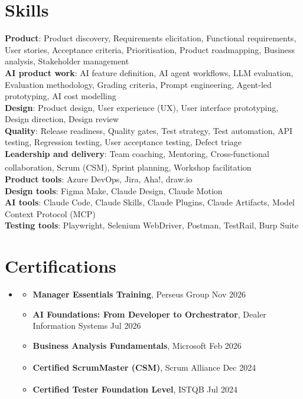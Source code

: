 \documentclass[letterpaper,11pt]{article}
\newcommand{\resumeItem}[1]{\item\small{#1 \vspace{-3.5pt}}}
\newcommand{\resumeSubHeadingListStart}{\begin{itemize}[leftmargin=0.15in, label={}]}
\newcommand{\resumeSubHeadingListEnd}{\end{itemize}}
\newcommand{\resumeItemListStart}{\begin{itemize}[topsep=3pt]}
\newcommand{\resumeItemListEnd}{\end{itemize}\vspace{-4pt}}
\begin{document}
\section{Skills}
 \begin{itemize}[leftmargin=0.15in, label={}]
    \small{\item{
     \textbf{Product}{: Product discovery, Requirements elicitation, Functional requirements, User stories, Acceptance criteria, Prioritisation, Product roadmapping, Business analysis, Stakeholder management} \\
     \textbf{AI product work}{: AI feature definition, AI agent workflows, LLM evaluation, Evaluation methodology, Grading criteria, Prompt engineering, Agent-led prototyping, AI cost modelling} \\
     \textbf{Design}{: Product design, User experience (UX), User interface prototyping, Design direction, Design review} \\
     \textbf{Quality}{: Release readiness, Quality gates, Test strategy, Test automation, API testing, Regression testing, User acceptance testing, Defect triage} \\
     \textbf{Leadership and delivery}{: Team coaching, Mentoring, Cross-functional collaboration, Scrum (CSM\textsuperscript{\textregistered}), Sprint planning, Workshop facilitation} \\
     \textbf{Product tools}{: Azure DevOps, Jira, Aha!, draw.io} \\
     \textbf{Design tools}{: Figma Make, Claude Design, Claude Motion} \\
     \textbf{AI tools}{: Claude Code, Claude Skills, Claude Plugins, Claude Artifacts, Model Context Protocol (MCP)} \\
     \textbf{Testing tools}{: Playwright, Selenium WebDriver, Postman, TestRail, Burp Suite}
    }}
 \end{itemize}

\section{Certifications}
  \resumeSubHeadingListStart
    \item
    \resumeItemListStart
      \resumeItem{\textbf{Manager Essentials Training}, Perseus Group \hfill Nov 2026}
      \resumeItem{\textbf{AI Foundations: From Developer to Orchestrator}, Dealer Information Systems \hfill Jul 2026}
      \resumeItem{\textbf{Business Analysis Fundamentals}, Microsoft \hfill Feb 2026}
      \resumeItem{\textbf{Certified ScrumMaster\textsuperscript{\textregistered} (CSM\textsuperscript{\textregistered})}, Scrum Alliance \hfill Dec 2024}
      \resumeItem{\textbf{Certified Tester Foundation Level}, ISTQB\textsuperscript{\textregistered} \hfill Jul 2024}
    \resumeItemListEnd
  \resumeSubHeadingListEnd
\end{document}
